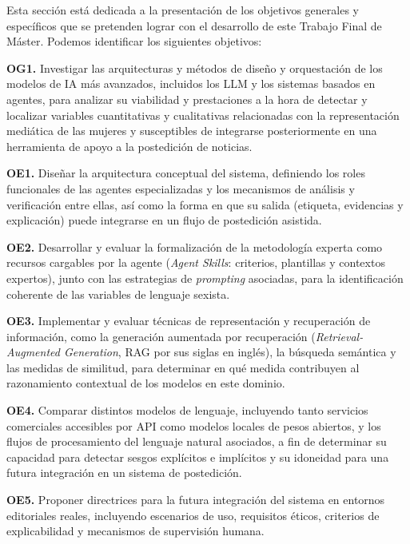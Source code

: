 
Esta sección está dedicada a la presentación de los objetivos generales y específicos que se pretenden lograr con el desarrollo de este Trabajo Final de Máster. Podemos identificar los siguientes objetivos:

\textbf{OG1.} Investigar las arquitecturas y métodos de diseño y orquestación de los modelos de IA más avanzados, incluidos los LLM y los sistemas basados en agentes, para analizar su viabilidad y prestaciones a la hora de detectar y localizar variables cuantitativas y cualitativas relacionadas con la representación mediática de las mujeres y susceptibles de integrarse posteriormente en una herramienta de apoyo a la postedición de noticias.

\textbf{OE1.} Diseñar la arquitectura conceptual del sistema, definiendo los roles funcionales de las agentes especializadas y los mecanismos de análisis y verificación entre ellas, así como la forma en que su salida (etiqueta, evidencias y explicación) puede integrarse en un flujo de postedición asistida.

\textbf{OE2.} Desarrollar y evaluar la formalización de la metodología experta como recursos cargables por la agente (\textit{Agent Skills}: criterios, plantillas y contextos expertos), junto con las estrategias de \textit{prompting} asociadas, para la identificación coherente de las variables de lenguaje sexista.

\textbf{OE3.} Implementar y evaluar técnicas de representación y recuperación de información, como la generación aumentada por recuperación (\textit{Retrieval-Augmented Generation}, RAG por sus siglas en inglés), la búsqueda semántica y las medidas de similitud, para determinar en qué medida contribuyen al razonamiento contextual de los modelos en este dominio.

\textbf{OE4.} Comparar distintos modelos de lenguaje, incluyendo tanto servicios comerciales accesibles por API como modelos locales de pesos abiertos, y los flujos de procesamiento del lenguaje natural asociados, a fin de determinar su capacidad para detectar sesgos explícitos e implícitos y su idoneidad para una futura integración en un sistema de postedición.

\textbf{OE5.} Proponer directrices para la futura integración del sistema en entornos editoriales reales, incluyendo escenarios de uso, requisitos éticos, criterios de explicabilidad y mecanismos de supervisión humana.


\newpage